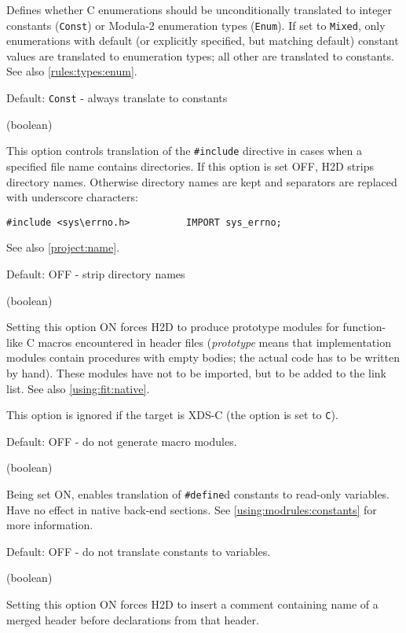 \begin{description}
Defines whether C enumerations should be unconditionally translated
to integer constants (\verb'Const') or Modula-2 enumeration types
(\verb'Enum'). If set to \verb'Mixed', only enumerations with default
(or explicitly specified, but matching default) constant values are
translated to enumeration types; all other are translated to constants.
See also \ref{rules:types:enum}.

Default: \verb'Const' - always translate to constants

 (boolean)

This option controls translation of the {\tt \#include} directive in cases
when a specified file name contains directories. If this option is set OFF, H2D
strips directory names. Otherwise directory names are kept and separators
are replaced with underscore characters:

\verb'#include <sys\errno.h>          IMPORT sys_errno;'

See also \ref{project:name}.

Default: OFF - strip directory names

 (boolean)

Setting this option ON forces H2D to produce prototype modules for
function-like C macros encountered in header files
({\em prototype} means that implementation modules contain procedures
with empty bodies; the actual code has to be written by hand).
These modules have not to be imported, but to be added to the link list.
See also \ref{using:fit:native}.

This option is ignored if the target is XDS-C (the  option
is set to \verb'C').

Default: OFF - do not generate macro modules.

 (boolean)

Being set ON, enables translation of \verb'#define'd constants
to read-only variables. Have no effect in native back-end sections.
See \ref{using:modrules:constants} for more information.

Default: OFF - do not translate constants to variables.

 (boolean)

Setting this option ON forces H2D to insert a comment containing name
of a merged header before declarations from that header.


\end{description}
